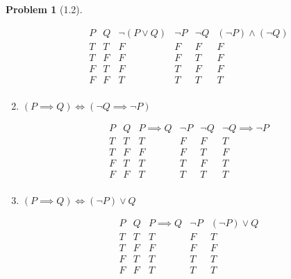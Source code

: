 \documentclass[12pt]{article}
\theoremstyle{definition}
\newtheorem{problem}{Problem}
\begin{document}
\begin{problem}[1.2]
\begin{enumerate}[label=(\alph*)]
\begin{solution}
\begin{displaymath}
                \begin{array}{c|c|c|c|c|c}
                P & Q & \neg (P \lor Q) & \neg P & \neg Q & (\neg P) \land (\neg Q)\\
                \hline
                T & T & F & F & F & F\\
                T & F & F & F & T & F\\
                F & T & F & T & F & F\\
                F & F & T & T & T & T\\
                \end{array}
            \end{displaymath}                
        \end{solution}
        \item $(P \implies Q) \iff (\neg Q \implies \neg P)$
        \begin{solution}
            \begin{displaymath}
                \begin{array}{c|c|c|c|c|c}
                P & Q & P \implies Q & \neg P & \neg Q & \neg Q \implies \neg P\\
                \hline
                T & T & T & F & F & T\\
                T & F & F & F & T & F\\
                F & T & T & T & F & T\\
                F & F & T & T & T & T\\
                \end{array}
            \end{displaymath}                
        \end{solution}
        \item $(P \implies Q) \iff (\neg P) \lor Q$
        \begin{solution}
            \begin{displaymath}
                \begin{array}{c|c|c|c|c}
                P & Q & P \implies Q & \neg P & (\neg P) \lor Q\\
                \hline
                T & T & T & F & T\\
                T & F & F & F & F\\
                F & T & T & T & T\\
                F & F & T & T & T\\
                \end{array}
            \end{displaymath}                

\end{solution}
\end{enumerate}
\end{problem}
\end{document}
